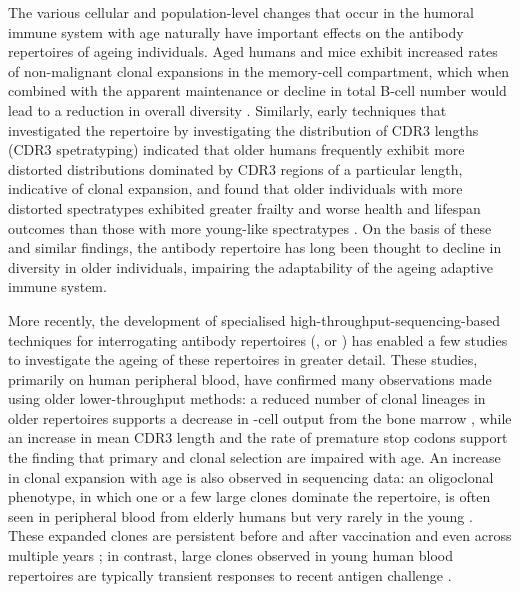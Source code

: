 The various cellular and population-level changes that occur in the humoral immune system with age naturally have important effects on the antibody repertoires of ageing individuals. Aged humans \parencite{siegrist2009extremes} and mice \parencite{dunnwalters2010bcellageing} exhibit increased rates of non-malignant clonal expansions in the memory-cell compartment, which when combined with the apparent maintenance or decline in total B-cell number would lead to a reduction in overall diversity \parencite{dunnwalters2010bcellageing}. Similarly, early techniques that investigated the repertoire by investigating the distribution of CDR3 lengths (CDR3 spetratyping) indicated that older humans frequently exhibit more distorted distributions dominated by CDR3 regions of a particular length, indicative of clonal expansion, and found that older individuals with more distorted spectratypes exhibited greater frailty and worse health and lifespan outcomes than those with more young-like spectratypes \parencite{gibson2009spectratyping}. On the basis of these and similar findings, the antibody repertoire has long been thought to decline in diversity in older individuals, impairing the adaptability of the ageing adaptive immune system.

More recently, the development of specialised high-throughput-sequencing-based techniques for interrogating antibody repertoires (\Igseq, or \igseq \parencite{weinstein2009igseq,georgiou2014promise}) has enabled a few studies to investigate the ageing of these repertoires in greater detail. These studies, primarily on human peripheral blood, have confirmed many observations made using older lower-throughput methods: a reduced number of clonal lineages in older repertoires supports a decrease in \naive-cell output from the bone marrow \parencite{jiang2013vaccine}, while an increase in mean CDR3 length \parencite{wang2014ageing} and the rate of premature stop codons \parencite{debourcy2017ageing} support the finding that primary and clonal selection are impaired with age. An increase in clonal expansion with age is also observed in sequencing data: an oligoclonal phenotype, in which one or a few large clones dominate the repertoire, is often seen in peripheral blood from elderly humans but very rarely in the young \parencite{wang2014ageing,debourcy2017ageing}. These expanded clones are persistent before and after vaccination \parencite{debourcy2017ageing} and even across multiple years \parencite{wang2014ageing}; in contrast, large clones observed in young human blood repertoires are typically transient responses to recent antigen challenge \parencite{wang2014ageing}.

